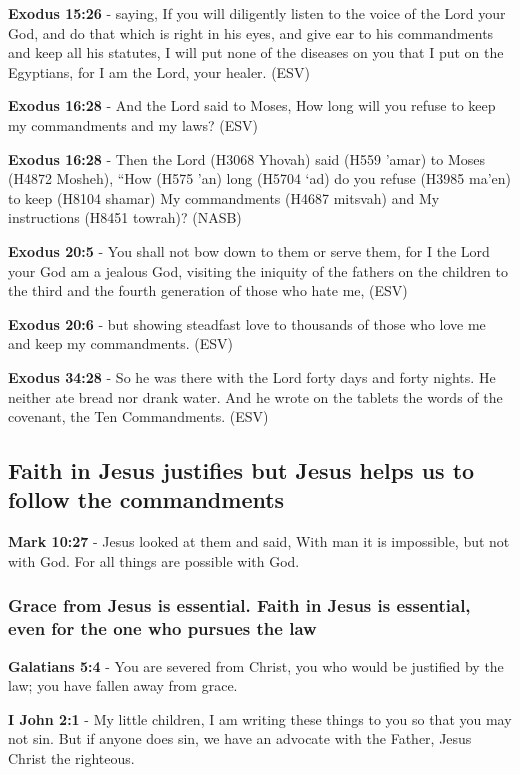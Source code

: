 \documentclass[11pt]{article}
\begin{document}
\textbf{Exodus 15:26} - saying, If you will diligently listen to the voice of the Lord your God, and do that which is right in his eyes, and give ear to his commandments and keep all his statutes, I will put none of the diseases on you that I put on the Egyptians, for I am the Lord, your healer. (ESV)

\textbf{Exodus 16:28} - And the Lord said to Moses, How long will you refuse to keep my commandments and my laws? (ESV)

\textbf{Exodus 16:28} - Then the Lord (H3068 Yhovah) said (H559 'amar) to Moses (H4872 Mosheh), “How (H575 'an) long (H5704 `ad) do you refuse (H3985 ma'en) to keep (H8104 shamar) My commandments (H4687 mitsvah) and My instructions (H8451 towrah)? (NASB)

\textbf{Exodus 20:5} - You shall not bow down to them or serve them, for I the Lord your God am a jealous God, visiting the iniquity of the fathers on the children to the third and the fourth generation of those who hate me, (ESV)

\textbf{Exodus 20:6} - but showing steadfast love to thousands of those who love me and keep my commandments. (ESV)

\textbf{Exodus 34:28} - So he was there with the Lord forty days and forty nights. He neither ate bread nor drank water. And he wrote on the tablets the words of the covenant, the Ten Commandments. (ESV)

\subsection{Faith in Jesus justifies but Jesus helps us to follow the commandments}
\label{sec:orgc72da8e}
\textbf{Mark 10:27} - Jesus looked at them and said, With man it is impossible, but not with God. For all things are possible with God.

\subsubsection{Grace from Jesus is essential. Faith in Jesus is essential, even for the one who pursues the law}
\label{sec:org70d20eb}
\textbf{Galatians 5:4} - You are severed from Christ, you who would be justified by the law; you have fallen away from grace.

\textbf{I John 2:1} - My little children, I am writing these things to you so that you may not sin. But if anyone does sin, we have an advocate with the Father, Jesus Christ the righteous.
\end{document}
